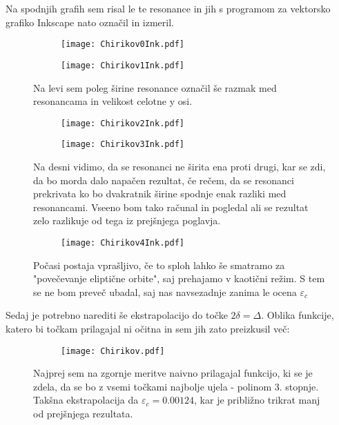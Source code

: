 \documentclass{article}
\begin{document}
Na spodnjih grafih sem risal le te resonance in jih s programom za vektorsko grafiko Inkscape nato označil in izmeril.

\begin{figure}[H]
\centering
\begin{subfigure}{.49\textwidth}
\texttt{[image: Chirikov0Ink.pdf]}
\end{subfigure}
\begin{subfigure}{.49\textwidth}
\texttt{[image: Chirikov1Ink.pdf]}
\end{subfigure}
\caption*{Na levi sem poleg širine resonance označil še razmak med resonancama in velikost celotne y osi. }
\end{figure}

\begin{figure}[H]
\centering
\begin{subfigure}{.49\textwidth}
\texttt{[image: Chirikov2Ink.pdf]}
\end{subfigure}
\begin{subfigure}{.49\textwidth}
\texttt{[image: Chirikov3Ink.pdf]}
\end{subfigure}
\caption*{Na desni vidimo, da se resonanci ne širita ena proti drugi, kar se zdi, da bo morda dalo napačen rezultat, če rečem, da se resonanci prekrivata ko bo dvakratnik širine spodnje enak razliki med resonancami. Vseeno bom tako računal in pogledal ali se rezultat zelo razlikuje od tega iz prejšnjega poglavja.}
\end{figure}


\begin{figure}[H]
\centering
\begin{subfigure}{.49\textwidth}
\texttt{[image: Chirikov4Ink.pdf]}
\end{subfigure}
\caption*{Počasi postaja vprašljivo, če to sploh lahko še smatramo za "povečevanje eliptične orbite", saj prehajamo v kaotični režim. S tem se ne bom preveč ubadal, saj nas navsezadnje zanima le ocena $\varepsilon_c$}
\end{figure}

Sedaj je potrebno narediti še ekstrapolacijo do točke $2\delta = \Delta$. Oblika funkcije, katero bi točkam prilagajal ni očitna in sem jih zato preizkusil več:

\begin{figure}[H]
\centering
\begin{subfigure}{.7\textwidth}
\texttt{[image: Chirikov.pdf]}
\end{subfigure}
\caption*{Najprej sem na zgornje meritve naivno prilagajal funkcijo, ki se je zdela, da se bo z vsemi točkami najbolje ujela - polinom 3. stopnje. Takšna ekstrapolacija da $\varepsilon_c = 0.00124$, kar je približno trikrat manj od prejšnjega rezultata.}
\end{figure}
\end{document}

